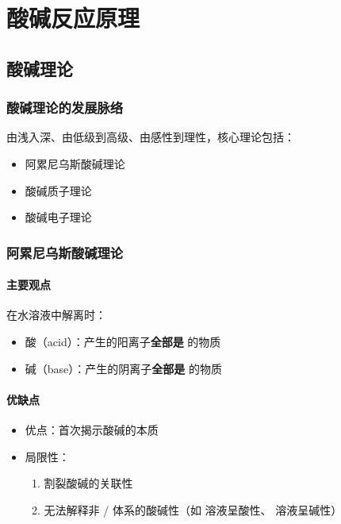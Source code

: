 \chapter{酸碱反应原理}

\section{酸碱理论}

\subsection{酸碱理论的发展脉络}
由浅入深、由低级到高级、由感性到理性，核心理论包括：
\begin{itemize}
    \item 阿累尼乌斯酸碱理论
    \item 酸碱质子理论  
    \item 酸碱电子理论
\end{itemize}

\subsection{阿累尼乌斯酸碱理论}
\subsubsection{主要观点}
在水溶液中解离时：
\begin{itemize}
    \item 酸（acid）：产生的阳离子\textbf{全部是}  的物质
    \item 碱（base）：产生的阴离子\textbf{全部是}  的物质
\end{itemize}

\subsubsection{优缺点}
\begin{itemize}
    \item 优点：首次揭示酸碱的本质
    \item 局限性：
    \begin{enumerate}
        \item 割裂酸碱的关联性
        \item 无法解释非 / 体系的酸碱性（如  溶液呈酸性、 溶液呈碱性）
    \end{enumerate}
\end{itemize}

